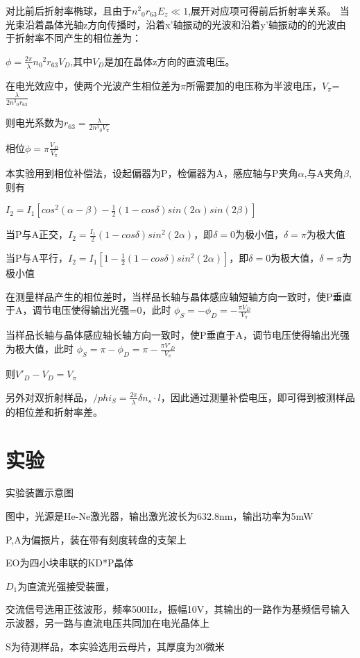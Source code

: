 \documentclass[font=default]{mpltx}
\begin{document}
对比前后折射率椭球，且由于${n^2}_0$$r_{63} E_z \ll 1$,展开对应项可得前后折射率关系。
当光束沿着晶体光轴z方向传播时，沿着x'轴振动的光波和沿着y'轴振动的的光波由于折射率不同产生的相位差为：

$\phi = \frac{2\pi}{\lambda}{n_0}^{2}r_{63}V_D$,其中$V_D$是加在晶体z方向的直流电压。

在电光效应中，使两个光波产生相位差为$\pi$所需要加的电压称为半波电压，$V_\pi$=$\frac{\lambda}{2{n^3}_0r_{63}}$

则电光系数为$r_{63} = \frac{\lambda}{2{n^3}_0V_\pi}$

相位$\phi = \pi \frac{V_D}{V_\pi}$


本实验用到相位补偿法，设起偏器为P，检偏器为A，感应轴与P夹角$\alpha$,与A夹角$\beta$,则有

$I_2 = I_1[cos^2 (\alpha - \beta) - \frac{1}{2} (1 - cos\delta)sin(2\alpha)sin(2\beta)]$

当P与A正交，$I_2 = \frac{I_1}{2} (1 - cos\delta)sin^2(2\alpha)$，即$\delta = 0$为极小值，$\delta = \pi$为极大值

当P与A平行，$I_2 = I_1[1 - \frac{1}{2} (1 - cos\delta)sin^2(2\alpha)]$，即$\delta = 0$为极大值，$\delta = \pi$为极小值

在测量样品产生的相位差时，当样品长轴与晶体感应轴短轴方向一致时，使P垂直于A，调节电压使得输出光强=0，此时
$\phi_S = - \phi_D = - \frac{\pi V_D}{V_\pi}$

当样品长轴与晶体感应轴长轴方向一致时，使P垂直于A，调节电压使得输出光强为极大值，此时
$\phi_S = \pi - \phi_D = \pi - \frac{\pi {V'}_D}{V_\pi}$

则${V'}_D - V_D = V_\pi$

另外对双折射样品，$/phi_S = \frac{2\pi}{\lambda} \delta n_s \cdot l$，因此通过测量补偿电压，即可得到被测样品的相位差和折射率差。

\section{实验}
实验装置示意图

图中，光源是He-Ne激光器，输出激光波长为632.8nm，输出功率为5mW

P,A为偏振片，装在带有刻度转盘的支架上

EO为四小块串联的KD*P晶体 

$D_1$为直流光强接受装置，

交流信号选用正弦波形，频率500Hz，振幅10V，其输出的一路作为基频信号输入示波器，另一路与直流电压共同加在电光晶体上

S为待测样品，本实验选用云母片，其厚度为20微米
\end{document}
